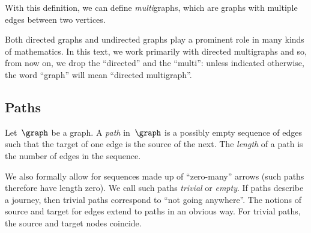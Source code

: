 With this definition, we can define \emph{multi}graphs, which are graphs with multiple edges between two vertices.


\begin{remark}
    Both directed graphs and undirected graphs play a prominent role in many kinds of mathematics.
    In this text, we work primarily with directed multigraphs and so, from now on, we drop the ``directed'' and the ``multi'': unless indicated otherwise, the word ``graph'' will mean ``directed multigraph''.
\end{remark}


\subsection{Paths}

\begin{definition}[Paths]
    \label{def:path}
    Let~$\graph$ be a graph.
    A \emph{path} in~$\graph$ is a possibly empty sequence of edges such that the target of one edge is the source of the next.
    The \emph{length} of a path is the number of edges in the sequence.
\end{definition}
We also formally allow for sequences made up of ``zero-many'' arrows (such paths therefore have length zero).
We call such paths \emph{trivial} or \emph{empty}.
If paths describe a journey, then trivial paths correspond to ``not going anywhere''.
The notions of source and target for edges extend to paths in an obvious way.
For trivial paths, the source and target nodes coincide.
